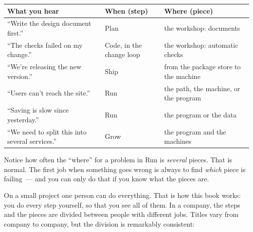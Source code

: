 {\def\LTcaptype{none} %
\begin{longtable}[]{@{}
  >{\raggedright\arraybackslash}p{}
  >{\raggedright\arraybackslash}p{}
  >{\raggedright\arraybackslash}p{}@{}}
\toprule\noalign{}
\begin{minipage}[b]{\linewidth}\raggedright
What you hear
\end{minipage} & \begin{minipage}[b]{\linewidth}\raggedright
When (step)
\end{minipage} & \begin{minipage}[b]{\linewidth}\raggedright
Where (piece)
\end{minipage} \\
\midrule\noalign{}
\endhead
\bottomrule\noalign{}
\endlastfoot
``Write the design document first.'' & Plan & the workshop: documents \\
``The checks failed on my change.'' & Code, in the change loop & the workshop: automatic checks \\
``We're releasing the new version.'' & Ship & from the package store to the machine \\
``Users can't reach the site.'' & Run & the path, the machine, or the program \\
``Saving is slow since yesterday.'' & Run & the program or the data \\
``We need to split this into several services.'' & Grow & the program and the machines \\
\end{longtable}
}

Notice how often the ``where'' for a problem in Run is \emph{several} pieces. That is normal. The first job when something goes wrong is always to find \emph{which} piece is failing~--- and you can only do that if you know what the pieces are.

\label{how-software-gets-built:layer-3-the-people}

On a small project one person can do everything. That is how this book works: you do every step yourself, so that you see all of them. In a company, the steps and the pieces are divided between people with different jobs. Titles vary from company to company, but the division is remarkably consistent:

